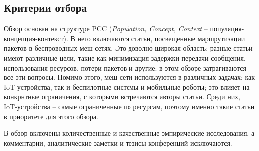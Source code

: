 \documentclass[%
]{report}
\begin{document}
\subsection{Критерии отбора}\label{eligibility-criteria}

Обзор основан на структуре PCC\cite{afc61c6cf471416489e36a4bc382d3b9}
(\emph{Population, Concept, Context} -- популяция-концепция-контекст).
В него включаются статьи, посвещенные маршрутизации пакетов в беспроводных меш-сетях.
Это доволно широкая область:
разные статьи имеют различные цели,
такие как минимизация задержки передачи сообщения,
использования ресурсов,
потери пакетов и другие: в этом обзоре затрагиваются
все эти вопросы.
Помимо этого, меш-сети используются в различных задачах:
как IoT-устройства, так и беспилотные системы
и мобильные роботы;
это влияет на конкрнтные ограничения,
с которыми встречаются авторы статьи.
Среди них, IoT-устройства -- самые ограниченные по ресурсам,
поэтому именно такие статьи в приоритете для этого обзора.

В обзор включены количественные и качественные эмпирические исследования,
а комментарии, аналитические заметки и тезисы конференций исключаются.

\end{document}
